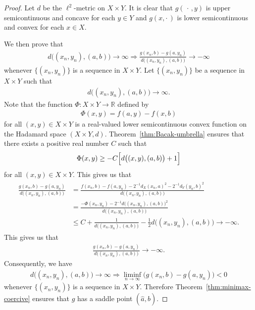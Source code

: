 \documentclass[draft]{amsart}
\numberwithin{equation}{section}
\def\R{\mathbb R}
\theoremstyle{plain}
\theoremstyle{definition}
\theoremstyle{remark}
\begin{document}
\begin{proof}
 Let $d$ be the $\ell^2$-metric on $X\times Y$. 
 It is clear that $g(\,\cdot\,, y)$ is 
 upper semicontinuous and concave for each $y\in Y$ 
 and $g(x,\cdot \,)$ is lower semicontinuous and convex 
 for each $x\in X$. 
 
 We then prove that 
 \begin{align}
  d\bigl((x_n,y_n), (a,b)\bigr)\to \infty 
  \Rightarrow \frac{g(x_n, b) - g(a, y_n)}
  {d\bigl((x_n,y_n), (a,b)\bigr)} 
  \to -\infty
 \end{align}
 whenever $\{(x_n,y_n)\}$ is a sequence in $X\times Y$. 
 Let $\{(x_n,y_n)\}$ be a sequence in $X\times Y$ such that 
 \begin{align}
  d\bigl((x_n,y_n), (a,b)\bigr)\to \infty. 
 \end{align}
 Note that the function $\Phi\colon X\times Y\to \R$ defined by 
 \begin{align}
  \Phi(x,y) = f(a,y) - f(x,b)
 \end{align} 
 for all $(x,y)\in X\times Y$ 
 is a real-valued lower semicontinuous convex function 
 on the Hadamard space $(X\times Y,d)$. 
 Theorem~\ref{thm:Bacak-umbrella} ensures that 
 there exists a positive real number $C$ such that 
 \begin{align}
  \Phi(x,y) \geq -C\Bigl[d\bigl((x,y),(a,b)\bigr)+1\Bigr]
 \end{align}
 for all $(x,y)\in X\times Y$. This gives us that 
 \begin{align}
 \begin{split}
  \frac{g(x_n, b) - g(a, y_n)}{d\bigl((x_n,y_n), (a,b)\bigr)} 
  &= \frac{f(x_n, b) - f(a, y_n)
  - 2^{-1}d_X(x_n,a)^2 - 2^{-1}d_Y(y_n,b)^2
  }{d\bigl((x_n,y_n), (a,b)\bigr)} \\
  &= \frac{-\Phi(x_n,y_n) 
  - 2^{-1} d\bigl((x_n,y_n), (a,b)\bigr)^2}{d\bigl((x_n,y_n), (a,b)\bigr)} \\
  &\leq C + \frac{1}{d\bigl((x_n,y_n), (a,b)\bigr)} 
  -\frac{1}{2}d\bigl((x_n,y_n), (a,b)\bigr) \to -\infty.   
 \end{split}
 \end{align}
 This gives us that 
\begin{align}
 \frac{g(x_n, b) - g(a, y_n)}
  {d\bigl((x_n,y_n), (a,b)\bigr)} 
  \to -\infty. 
\end{align}
 Consequently, we have 
 \begin{align}
  d\bigl((x_n,y_n), (a,b)\bigr)\to \infty 
  \Rightarrow \liminf_{n\to \infty}\bigl(g(x_n, b) - g(a, y_n)\bigr) <0
 \end{align}
 whenever $\{(x_n,y_n)\}$ is a sequence in $X\times Y$. 
 Therefore Theorem~\ref{thm:minimax-coercive} ensures that 
 $g$ has a saddle point $(\hat{a},\hat{b})$. 


\end{proof}
\end{document}
